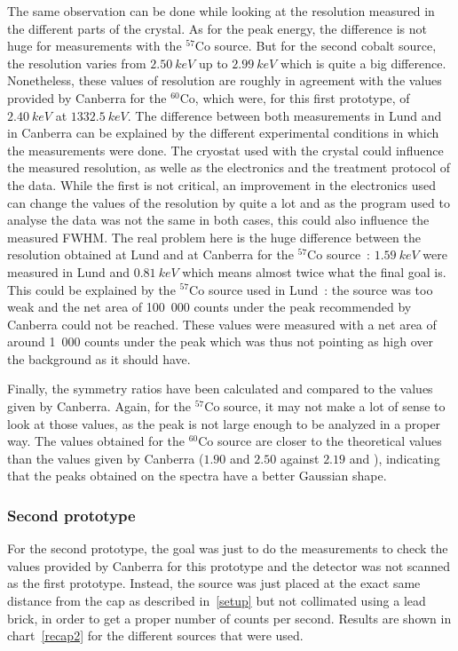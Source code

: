 \documentclass[11pt,a4paper]{article}
\begin{document}
The same observation can be done while looking at the resolution measured in the different parts of the crystal. As for the peak energy, the difference is not huge for measurements with the $^{57}$Co source. But for the second cobalt source, the resolution varies from $2.50~keV$ up to $2.99~keV$ which is quite a big difference. Nonetheless, these values of resolution are roughly in agreement with the values provided by Canberra for the $^{60}$Co, which were, for this first prototype, of $2.40~keV$ at $1332.5~keV$. The difference between both measurements in Lund and in Canberra can be explained by the different experimental conditions in which the measurements were done. The cryostat used with the crystal could influence the measured resolution, as welle as the electronics and the treatment protocol of the data. While the first is not critical, an improvement in the electronics used can change the values of the resolution by quite a lot and as the program used to analyse the data was not the same in both cases, this could also influence the measured FWHM. The real problem here is the huge difference between the resolution obtained at Lund and at Canberra for the $^{57}$Co source~: $1.59~keV$ were measured in Lund and $0.81~keV$ which means almost twice what the final goal is. This could be explained by the $^{57}$Co source used in Lund~: the source was too weak and the net area of 100~000 counts under the peak recommended by Canberra could not be reached. These values were measured with a net area of around 1~000 counts under the peak which was thus not pointing as high over the background as it should have.

Finally, the symmetry ratios have been calculated and compared to the values given by Canberra. Again, for the $^{57}$Co source, it may not make a lot of sense to look at those values, as the peak is not large enough to be analyzed in a proper way. The values obtained for the $^{60}$Co source are closer to the theoretical values than the values given by Canberra ($1.90$ and $2.50$ against $2.19$ and $ $), indicating that the peaks obtained on the spectra have a better Gaussian shape.

\subsubsection{Second prototype}

For the second prototype, the goal was just to do the measurements to check the values provided by Canberra for this prototype and the detector was not scanned as the first prototype. Instead, the source was just placed at the exact same distance from the cap as described in~\ref{setup} but not collimated using a lead brick, in order to get a proper number of counts per second. Results are shown in chart~\ref{recap2} for the different sources that were used.
\end{document}
